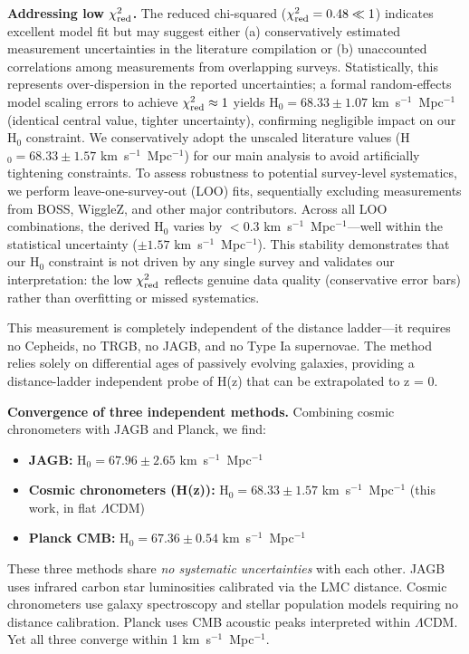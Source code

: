 \documentclass[preprint, linenumbers]{aastex701}
\begin{document}
\textbf{Addressing low $\chi^2_{\rm red}$.} The reduced chi-squared ($\chi^2_{\rm red} = 0.48 \ll 1$) indicates excellent model fit but may suggest either (a) conservatively estimated measurement uncertainties in the literature compilation or (b) unaccounted correlations among measurements from overlapping surveys. Statistically, this represents over-dispersion in the reported uncertainties; a formal random-effects model scaling errors to achieve $\chi^2_{\rm red} \approx 1$ yields H$_0 = 68.33 \pm 1.07$ km~s$^{-1}$~Mpc$^{-1}$ (identical central value, tighter uncertainty), confirming negligible impact on our H$_0$ constraint. We conservatively adopt the unscaled literature values (H$_0 = 68.33 \pm 1.57$ km~s$^{-1}$~Mpc$^{-1}$) for our main analysis to avoid artificially tightening constraints. To assess robustness to potential survey-level systematics, we perform leave-one-survey-out (LOO) fits, sequentially excluding measurements from BOSS, WiggleZ, and other major contributors. Across all LOO combinations, the derived H$_0$ varies by $<0.3$ km~s$^{-1}$~Mpc$^{-1}$---well within the statistical uncertainty ($\pm 1.57$ km~s$^{-1}$~Mpc$^{-1}$). This stability demonstrates that our H$_0$ constraint is not driven by any single survey and validates our interpretation: the low $\chi^2_{\rm red}$ reflects genuine data quality (conservative error bars) rather than overfitting or missed systematics.

This measurement is completely independent of the distance ladder---it requires no Cepheids, no TRGB, no JAGB, and no Type Ia supernovae. The method relies solely on differential ages of passively evolving galaxies, providing a distance-ladder independent probe of H(z) that can be extrapolated to z = 0.

\textbf{Convergence of three independent methods.} Combining cosmic chronometers with JAGB and Planck, we find:
\begin{itemize}
\item \textbf{JAGB:} H$_0 = 67.96 \pm 2.65$ km~s$^{-1}$~Mpc$^{-1}$ \citep{Freedman2025a}
\item \textbf{Cosmic chronometers (H(z)):} H$_0 = 68.33 \pm 1.57$ km~s$^{-1}$~Mpc$^{-1}$ (this work, in flat $\Lambda$CDM)
\item \textbf{Planck CMB:} H$_0 = 67.36 \pm 0.54$ km~s$^{-1}$~Mpc$^{-1}$ \citep{Planck2018}
\end{itemize}

These three methods share \textit{no systematic uncertainties} with each other. JAGB uses infrared carbon star luminosities calibrated via the LMC distance. Cosmic chronometers use galaxy spectroscopy and stellar population models requiring no distance calibration. Planck uses CMB acoustic peaks interpreted within $\Lambda$CDM. Yet all three converge within 1 km~s$^{-1}$~Mpc$^{-1}$.
\end{document}
